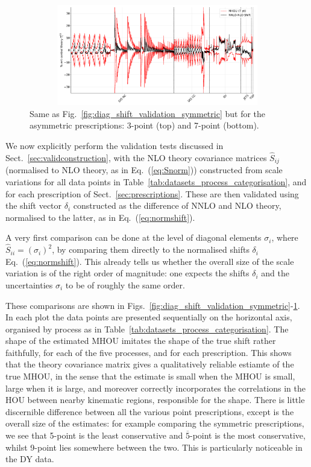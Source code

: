 \begin{figure}[t!]
\begin{center}
    \includegraphics[width=14cm, height=4.4cm]{mhous/plots/shift_diag_cov_comparison_7pt_global.pdf}
    \caption{\small Same as Fig.~\ref{fig:diag_shift_validation_symmetric} but for
    the asymmetric prescriptions: 3-point (top) and 7-point (bottom).}
    \label{fig:diag_shift_validation_asymmetric}
  \end{center}
\end{figure}


We now explicitly perform the validation tests discussed in
Sect.~\ref{sec:validconstruction}, with the NLO theory covariance matrices 
$\widehat{S}_{ij}$ (normalised to NLO theory, as in
Eq.~(\ref{eq:Snorm})) constructed from scale variations for all data
points in Table~\ref{tab:datasets_process_categorisation}, and for
each prescription of
Sect.~\ref{sec:prescriptions}. These are then validated using the shift vector $\delta_i$ constructed as the difference of NNLO and NLO theory, normalised to the latter, as in Eq.~(\ref{eq:normshift}).

A very first comparison can be done at the level of diagonal elements $\sigma_i$, where $\widehat{S}_{ii} = (\sigma_i)^2$, 
by comparing them directly to the normalised shifts
${\delta}_i$ Eq.~(\ref{eq:normshift}).
This already tells us
whether the overall size of the scale variation 
is of the right order of magnitude: one expects
the shifts $\delta_i$ and the uncertainties $\sigma_i$ to be of roughly the
same order.


These comparisons are shown in
Figs.~\ref{fig:diag_shift_validation_symmetric}-\ref{fig:diag_shift_validation_asymmetric}.
In each plot the data points are presented sequentially on the horizontal axis, organised by process as in Table~\ref{tab:datasets_process_categorisation}.
The shape of the estimated MHOU imitates the 
shape of the true shift rather faithfully, for each of the five
processes, and for each prescription. This shows that the theory
covariance matrix gives a qualitatively reliable estiamte of the true
MHOU, in the sense that the estimate is small when the MHOU is small,
large when it is large, and moreover correctly incorporates the
correlations in the HOU between nearby kinematic regions, responsible
for the shape. There is little discernible difference between all the
various point prescriptions, except is the overall size of the
estimates: for example comparing the symmetric prescriptions, we 
see that 5-point is the least conservative and $\overline{5}$-point is the most conservative, whilst 9-point lies somewhere between the two. This is particularly noticeable in the DY data. 

